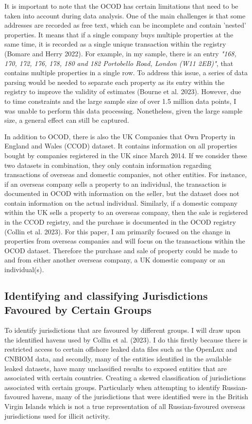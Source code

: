 \documentclass{article}
\begin{document}
It is important to note that the OCOD has certain limitations that need to be taken into account during data analysis. One of the main challenges is that some addresses are recorded as free text, which can be incomplete and contain 'nested' properties. It means that if a single company buys multiple properties at the same time, it is recorded as a single unique transaction within the registry (Bomare and Herry 2022). For example, in my sample, there is an entry \textit{"168, 170, 172, 176, 178, 180 and 182 Portobello Road, London (W11 2EB)"}, that contains multiple properties in a single row. To address this issue, a series of data parsing would be needed to separate each property as its entry within the registry to improve the validity of estimates (Bourne et al. 2023). However, due to time constraints and the large sample size of over 1.5 million data points, I was unable to perform this data processing. Nonetheless, given the large sample size, a general effect can still be captured.

In addition to OCOD, there is also the UK Companies that Own Property in England and Wales (CCOD) dataset. It contains information on all properties bought by companies registered in the UK since March 2014. If we consider these two datasets in combination, they only contain information regarding transactions of overseas and domestic companies, not other entities. For instance, if an overseas company sells a property to an individual, the transaction is documented in OCOD with information on the seller, but the dataset does not contain information on the actual individual. Similarly, if a domestic company within the UK sells a property to an overseas company, then the sale is registered in the CCOD registry, and the purchase is documented in the OCOD registry (Collin et al. 2023). For this paper, I am primarily focused on the change in properties from overseas companies and will focus on the transactions within the OCOD dataset. Therefore the purchase and sale of property could be made to and from either another overseas company, a UK domestic company or an individual(s). 

\subsection{Identifying and classifying Jurisdictions Favoured by Certain Groups}
To identify jurisdictions that are favoured by different groups. I will draw upon the identified havens used by Collin et al. (2023). I do this firstly because there is restricted access to certain offshore leaked data files such as the OpenLux and CNBIOM data, and secondly, many of the entities identified in the available leaked datasets, have many unclassified results to exposed entities that are associated with certain countries. Creating a skewed classification of jurisdictions associated with certain groups. Particularly when attempting to identify Russian-favoured havens, many of the jurisdictions that were identified were in the British Virgin Islands which is not a true representation of all Russian-favoured overseas jurisdictions used for illicit activity. 
\end{document}
